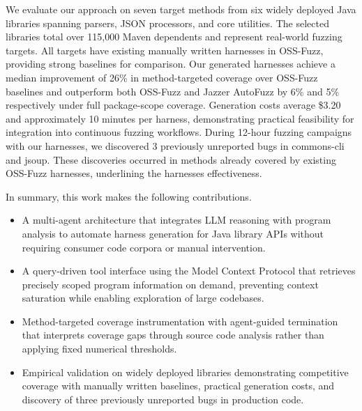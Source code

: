 We evaluate our approach on seven target methods from six widely deployed Java libraries spanning parsers, JSON processors, and core utilities. The selected libraries total over 115,000 Maven dependents and represent real-world fuzzing targets. All targets have existing manually written harnesses in OSS-Fuzz, providing strong baselines for comparison. Our generated harnesses achieve a median improvement of 26\% in method-targeted coverage over OSS-Fuzz baselines and outperform both OSS-Fuzz and Jazzer AutoFuzz by 6\% and 5\% respectively under full package-scope coverage. Generation costs average \$3.20 and approximately 10 minutes per harness, demonstrating practical feasibility for integration into continuous fuzzing workflows. During 12-hour fuzzing campaigns with our harnesses, we  discovered 3 previously unreported bugs in commons-cli and jsoup. These discoveries occurred in methods already covered by existing OSS-Fuzz harnesses, underlining the harnesses effectiveness. 
\par
In summary, this work makes the following contributions.
\begin{itemize}
    \item A multi-agent architecture that integrates LLM reasoning with program analysis to automate harness generation for Java library APIs without requiring consumer code corpora or manual intervention.

    \item A query-driven tool interface using the Model Context Protocol that retrieves precisely scoped program information on demand, preventing context saturation while enabling exploration of large codebases.

    \item Method-targeted coverage instrumentation with agent-guided termination that interprets coverage gaps through source code analysis rather than applying fixed numerical thresholds.

    \item Empirical validation on widely deployed libraries demonstrating competitive coverage with manually written baselines, practical generation costs, and discovery of three previously unreported bugs in production code.
\end{itemize}
